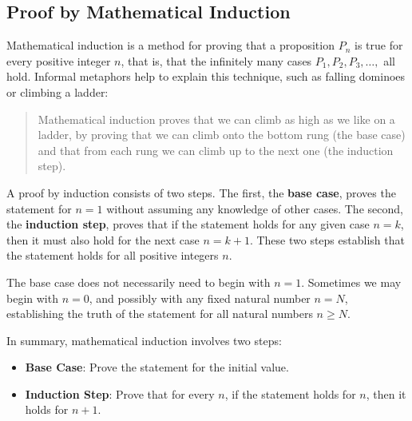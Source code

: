 \subsection{Proof by Mathematical Induction}
Mathematical induction is a method for proving that a proposition $P_n$ is true for every positive integer $n$, that is, that the infinitely many cases $P_1, P_2, P_3, \dots,$ all hold. Informal metaphors help to explain this technique, such as falling dominoes or climbing a ladder:
\begin{quote}
    Mathematical induction proves that we can climb as high as we like on a ladder, by proving that we can climb onto the bottom rung (the base case) and that from each rung we can climb up to the next one (the induction step).
\end{quote}

A proof by induction consists of two steps. The first, the \textbf{base case}, proves the statement for $n = 1$ without assuming any knowledge of other cases. The second, the \textbf{induction step}, proves that if the statement holds for any given case $n = k$, then it must also hold for the next case $n = k + 1$. These two steps establish that the statement holds for all positive integers $n$.

The base case does not necessarily need to begin with $n = 1$. Sometimes we may begin with $n = 0$, and possibly with any fixed natural number $n = N$, establishing the truth of the statement for all natural numbers $n \geq N$.

In summary, mathematical induction involves two steps:
\begin{itemize}
    \item \textbf{Base Case}: Prove the statement for the initial value.
    \item \textbf{Induction Step}: Prove that for every $n$, if the statement holds for $n$, then it holds for $n + 1$.
\end{itemize}

